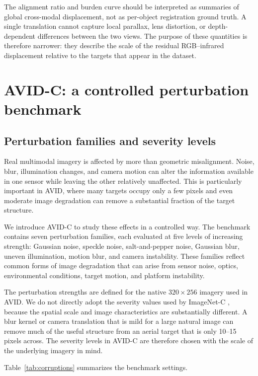 \documentclass[10pt]{article}
\newcommand{\dataset}{\textsc{AVID}}
\newcommand{\corrupt}{\textsc{AVID-C}}
\begin{document}
The alignment ratio and burden curve should be interpreted as summaries of global cross-modal displacement, not as per-object registration ground truth. A single translation cannot capture local parallax, lens distortion, or depth-dependent differences between the two views. The purpose of these quantities is therefore narrower: they describe the scale of the residual RGB--infrared displacement relative to the targets that appear in the dataset.


\section{AVID-C: a controlled perturbation benchmark}
\label{sec:avidc}

\subsection{Perturbation families and severity levels}

Real multimodal imagery is affected by more than geometric misalignment. Noise, blur, illumination changes, and camera motion can alter the information available in one sensor while leaving the other relatively unaffected. This is particularly important in \dataset{}, where many targets occupy only a few pixels and even moderate image degradation can remove a substantial fraction of the target structure.

We introduce \corrupt{} to study these effects in a controlled way. The benchmark contains seven perturbation families, each evaluated at five levels of increasing strength: Gaussian noise, speckle noise, salt-and-pepper noise, Gaussian blur, uneven illumination, motion blur, and camera instability. These families reflect common forms of image degradation that can arise from sensor noise, optics, environmental conditions, target motion, and platform instability.

The perturbation strengths are defined for the native $320\times256$ imagery used in \dataset{}. We do not directly adopt the severity values used by ImageNet-C \citep{hendrycks2019benchmarking}, because the spatial scale and image characteristics are substantially different. A blur kernel or camera translation that is mild for a large natural image can remove much of the useful structure from an aerial target that is only 10--15 pixels across. The severity levels in \corrupt{} are therefore chosen with the scale of the underlying imagery in mind.

Table~\ref{tab:corruptions} summarizes the benchmark settings.
\end{document}
